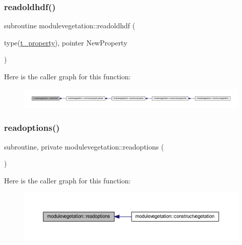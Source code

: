 \subsubsection{\texorpdfstring{readoldhdf()}{readoldhdf()}}
{\footnotesize\ttfamily subroutine modulevegetation\+::readoldhdf (\begin{DoxyParamCaption}\item[{type(\mbox{\hyperlink{structmodulevegetation_1_1t__property}{t\+\_\+property}}), pointer}]{New\+Property }\end{DoxyParamCaption})\hspace{0.3cm}{\ttfamily [private]}}

Here is the caller graph for this function\+:\nopagebreak
\begin{figure}[H]
\begin{center}
\leavevmode
\includegraphics[width=350pt]{namespacemodulevegetation_a0a43607cdb2236530e5fb3fefa7498f1_icgraph}
\end{center}
\end{figure}
\mbox{\label{namespacemodulevegetation_af3a330cccc5b43beef6be4d97ca341ad}} 
\subsubsection{\texorpdfstring{readoptions()}{readoptions()}}
{\footnotesize\ttfamily subroutine, private modulevegetation\+::readoptions (\begin{DoxyParamCaption}{ }\end{DoxyParamCaption})\hspace{0.3cm}{\ttfamily [private]}}

Here is the caller graph for this function\+:\nopagebreak
\begin{figure}[H]
\begin{center}
\leavevmode
\includegraphics[width=350pt]{namespacemodulevegetation_af3a330cccc5b43beef6be4d97ca341ad_icgraph}
\end{center}
\end{figure}
\mbox{\label{namespacemodulevegetation_abfd09d09ab90a3303dcc3a496d57223a}} 
